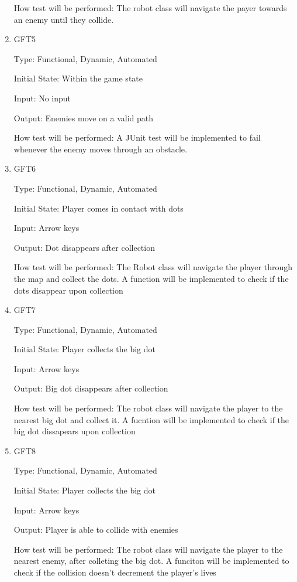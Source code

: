\documentclass[12pt, titlepage]{article}
\begin{document}
\begin{enumerate}
How test will be performed: The robot class will navigate the payer towards an enemy until they collide.

\item{GFT5\\}

Type: Functional, Dynamic, Automated
					
Initial State: Within the game state
					
Input: No input
					
Output: Enemies move on a valid path

How test will be performed: A JUnit test will be implemented to fail whenever the enemy moves through an obstacle.

\item{GFT6\\}

Type: Functional, Dynamic, Automated
					
Initial State: Player comes in contact with dots
					
Input: Arrow keys
					
Output: Dot disappears after collection

How test will be performed: The Robot class will navigate the player through the map and collect the dots. A function will be implemented to check if the dots disappear upon collection

\item{GFT7\\}

Type: Functional, Dynamic, Automated
					
Initial State: Player collects the big dot
					
Input: Arrow keys
					
Output: Big dot disappears after collection

How test will be performed: The robot class will navigate the player to the nearest big dot and collect it. A fucntion will be implemented to check if the big dot dissapears upon collection

\item{GFT8\\}

Type: Functional, Dynamic, Automated
					
Initial State: Player collects the big dot
					
Input: Arrow keys
					
Output: Player is able to collide with enemies

How test will be performed: The robot class will navigate the player to the nearest enemy, after colleting the big dot. A funciton will be implemented to check if the collision doesn't decrement the player's lives


\end{enumerate}
\end{document}
